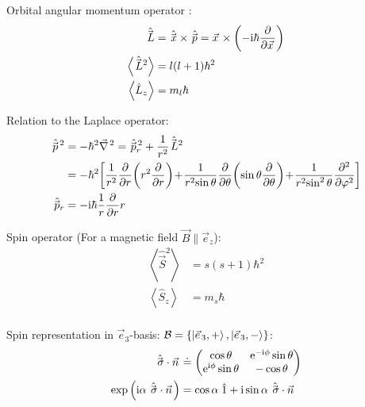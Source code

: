 			\noindent
			Orbital angular momentum operator :
			\begin{equation}
				\begin{aligned}
					\hat{\vec{L}} &= \hat{\vec{x}}\times \hat{\vec{p}} = \vec{x}\times\left(-\i\hbar\pdv{\vec{x}}\right) \\
					\left< \hat{\vec{L}}^2 \right> &= l(l+1)\hbar^2 \\
					\left< \hat{L}_z \right> &= m_l \hbar \\
				\end{aligned}
			\end{equation}

			\noindent
			Relation to the Laplace operator:
			\begin{equation}
				\begin{aligned}
					\hat{\vec{p}}^{\,2} &= -\hbar^2 \Nabla^2 = \hat{\vec{p}}_r^{\,2} + \frac{1}{r^2} \hat{\vec{L}}^2 \\
					&= -\hbar^2 \qty[{\displaystyle \frac{1}{r^{2}} \frac{\partial }{\partial r}\!\left(r^{2}\frac{\partial }{\partial r}\right)\!+\!\frac{1}{r^{2}\!\sin \theta } \frac{\partial }{\partial \theta }\!\left(\sin \theta \frac{\partial }{\partial \theta }\right)\!+\!\frac{1}{r^{2}\!\sin ^{2}\theta }\frac{\partial ^{2}}{\partial \varphi ^{2}}}]\\
					\hat{\vec{p}}_r &= -\i\hbar\frac{1}{r}\pdv{r}r \\
				\end{aligned}
			\end{equation}

			\noindent
			Spin operator  (For a magnetic field $\vec{B}\parallel\vec{e}_z$):
			\begin{equation}
				\begin{aligned}
					\left<\hat{\vec{S}}^2\right> &= s(s+1)\hbar^2 \\
					\left<\hat{S}_z\right> &= m_s \hbar \\
				\end{aligned}
			\end{equation}

			\noindent
			Spin representation in $\vec{e}_3$-basis: $\mathcal{B} = \{ \Ket{\vec{e}_3,+}, \Ket{\vec{e}_3,-} \}$:
			\begin{equation}
				\begin{aligned}
					\hat{\vec{\sigma}} \cdot \vec{n} &\doteq
					\left( \begin{matrix}
							\cos\theta             & \ex^{-\i\phi}\sin\theta \\
							\ex^{\i\phi}\sin\theta & -\cos\theta             \\
						\end{matrix} \right) \\
					\exp\left( \i\alpha \; \hat{\vec{\sigma}} \cdot \vec{n} \right) &= \cos\alpha \;\hat{1} + \i\sin\alpha \; \hat{\vec{\sigma}} \cdot \vec{n} \\
				\end{aligned}
			\end{equation}

